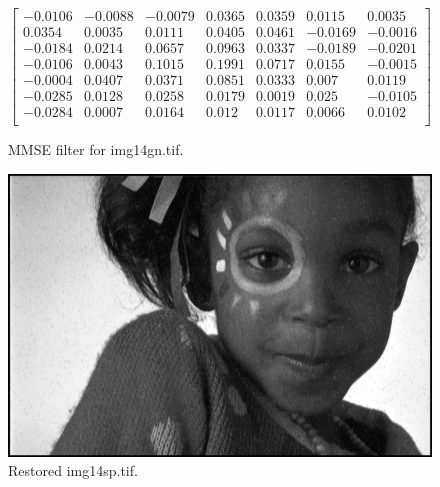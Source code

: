 \documentclass{article}
\begin{document}
\begin{figure}[H]
    \begin{equation*}
        \begin{bmatrix}
        -0.0106 & -0.0088 & -0.0079 & 0.0365 & 0.0359 & 0.0115 & 0.0035\\
        0.0354 & 0.0035 & 0.0111 & 0.0405 & 0.0461 & -0.0169 & -0.0016\\
        -0.0184 & 0.0214 & 0.0657 & 0.0963 & 0.0337 & -0.0189 & -0.0201\\
        -0.0106 & 0.0043 & 0.1015 & 0.1991 & 0.0717 & 0.0155 & -0.0015\\
        -0.0004 & 0.0407 & 0.0371 & 0.0851 & 0.0333 & 0.007 & 0.0119\\
        -0.0285 & 0.0128 & 0.0258 & 0.0179 & 0.0019 & 0.025 & -0.0105\\
        -0.0284 & 0.0007 & 0.0164 & 0.012 & 0.0117 & 0.0066 & 0.0102\\
        \end{bmatrix}
    \end{equation*}
\caption{MMSE filter for img14gn.tif.}
\end{figure}
\begin{figure}[H]
    \centering
    \includegraphics[width=1\textwidth]{../1-img14sp-restored.png}
    \caption{Restored img14sp.tif.}
\end{figure}
\end{document}
